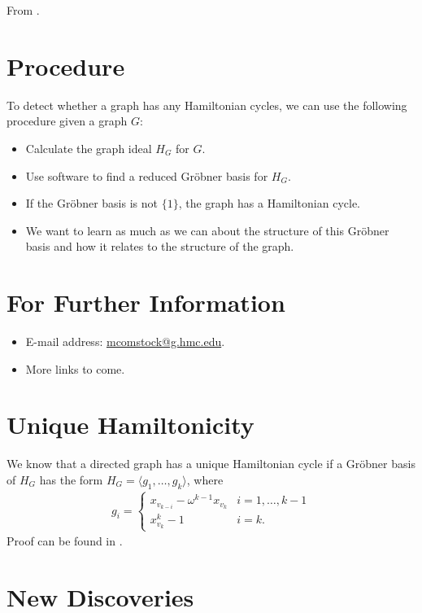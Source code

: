 \documentclass[thesis]{hmcposter}
\renewcommand{\(}{\left(}
\renewcommand{\)}{\right)}
\newcommand{\<}{\langle}
\renewcommand{\>}{\rangle}
\begin{document}
\begin{poster}
From \cite{deloera10}.

\section{Procedure}%

To detect whether a graph has any Hamiltonian cycles, we can use the following procedure given a graph $G$:
\begin{itemize}
	\item Calculate the graph ideal $H_G$ for $G$.\\
	\item Use software to find a reduced Gr\"obner basis for $H_G$.\\
	\item If the Gr\"obner basis is not $\{1\}$, the graph has a Hamiltonian cycle.
	\item We want to learn as much as we can about the structure of this Gr\"obner basis and how it relates to the structure of the graph.
\end{itemize}

\section{For Further Information}

\begin{itemize}
\item E-mail address: \url{mcomstock@g.hmc.edu}.
\item More links to come.
\end{itemize}


\vfill
\columnbreak


\section{Unique Hamiltonicity}

We know that a directed graph has a unique Hamiltonian cycle if a Gr\"obner basis of $H_G$ has the form $H_G = \<g_1,\ldots,g_k\>$, where
\begin{align*}
	g_i = \left \{
		\begin{array}{ll}
		x_{v_{k-i}} - \omega^{k-1} x_{v_k} & i = 1,\ldots,k-1\\
		x_{v_k}^k - 1 & i = k.
		\end{array} \right .
\end{align*}
Proof can be found in \cite{deloera10}.

\section{New Discoveries}


\end{poster}
\end{document}
